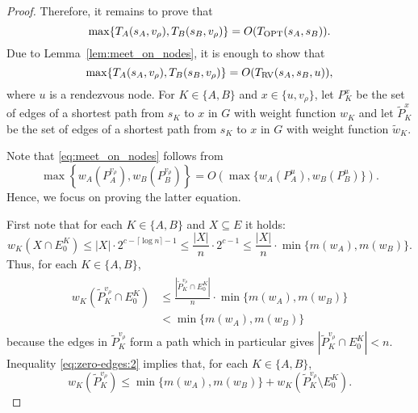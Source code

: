 \documentclass{llncs}
\newcommand{\Topt}[2]{T_{{\scriptsize \textup{OPT}}}(#1,#2)}
\newcommand{\dist}[4][]{\if!#1!T_{#2}(#3,#4)\else T_{#2}(#3,#4,#1)\fi}
\newcommand{\TRV}[3]{T_{{\scriptsize \textup{RV}}}(#1,#2,#3)}
\newcommand{\startpos}[1]{s_{#1}}
\newcommand{\starta}{\startpos{A}}
\newcommand{\startb}{\startpos{B}}
\newcommand{\agentVariable}{K}
\begin{document}
\begin{proof}
Therefore, it remains to prove that 
\[
 \max\{\dist{A}{\startpos{A}}{v_{\rho}},\dist{B}{\startpos{B}}{v_{\rho}}\}=O(\Topt{\startpos{A}}{\startpos{B}}).
\]
Due to Lemma~\ref{lem:meet_on_nodes}, it is enough to show that
\begin{equation} \label{eq:meet_on_nodes}
\max\{\dist{A}{\startpos{A}}{v_{\rho}},\dist{B}{\startpos{B}}{v_{\rho}}\}=O(\TRV{\starta}{\startb}{u}),
\end{equation}
where $u$ is a rendezvous node.
For ${\agentVariable}\in\{A,B\}$ and $x\in\{u,v_{\rho}\}$, let $P_{\agentVariable}^x$ be the set of edges of a shortest path from $\startpos{{\agentVariable}}$ to $x$ in $G$ with weight function $w_{\agentVariable}$ and let $\widetilde{P}_{\agentVariable}^x$ be the set of edges of a shortest path from $\startpos{{\agentVariable}}$ to $x$ in $G$ 
with weight function $\widetilde{w}_{\agentVariable}$.

Note that \eqref{eq:meet_on_nodes} follows from
\begin{equation} \label{eq:meet_on_nodes2}
\max\left\{w_A(P_A^{v_{\rho}}),w_B(P_B^{v_{\rho}})\right\}=O\left(\max\{w_A(P_A^u),w_B(P_B^u)\}\right).
\end{equation}
Hence, we focus on proving the latter equation.

First note that for each ${\agentVariable}\in\{A,B\}$ and $X\subseteq E$ it holds: 
\begin{equation} \label{eq:zero-edges}
w_{\agentVariable}(X\cap E_0^{{\agentVariable}})\leq |X|\cdot 2^{c-\lceil\log n\rceil-1}\leq \frac{|X|}{n}\cdot 2^{c-1} \leq \frac{|X|}{n}\cdot\min\{m(w_A),m(w_B)\}.
\end{equation}
Thus, for each ${\agentVariable}\in\{A,B\}$,
\begin{align} \label{eq:zero-edges:2}
\begin{split}
w_{\agentVariable}(\widetilde{P}_{\agentVariable}^{v_{\rho}}\cap E_0^{\agentVariable}) & \leq \frac{|\widetilde{P}_{\agentVariable}^{v_{\rho}}\cap E_0^{\agentVariable}|}{n}\cdot \min\{m(w_A),m(w_B)\} \\
& < \min\{m(w_A),m(w_B)\}
\end{split}
\end{align}
because the edges in $\widetilde{P}_{\agentVariable}^{v_{\rho}}$ 
form a path which in particular gives $|\widetilde{P}_{\agentVariable}^{v_{\rho}}\cap E_0^{\agentVariable}|<n$.
Inequality \eqref{eq:zero-edges:2} implies that, for each ${\agentVariable}\in\{A,B\}$,
\begin{equation} \label{eq:bound:v:1}
w_{\agentVariable}(\widetilde{P}_{\agentVariable}^{v_{\rho}}) \leq \min\{m(w_A),m(w_B)\} + w_{\agentVariable}(\widetilde{P}_{\agentVariable}^{v_{\rho}}\setminus E_0^{\agentVariable}).
\end{equation}



\end{proof}
\end{document}
